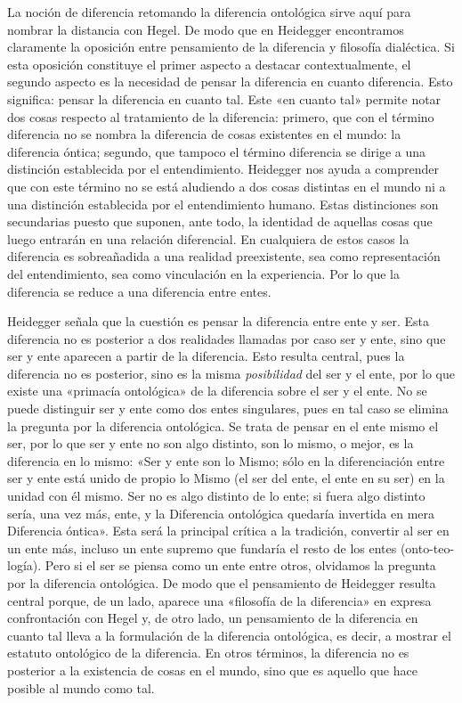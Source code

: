 La noción de diferencia retomando la diferencia ontológica sirve aquí para nombrar la distancia con Hegel. De modo que en Heidegger encontramos claramente la oposición entre pensamiento de la diferencia y filosofía dialéctica. Si esta oposición constituye el primer aspecto a destacar contextualmente, el segundo aspecto es la necesidad de pensar la diferencia en cuanto diferencia. Esto significa: pensar la diferencia en cuanto tal. Este «en cuanto tal» permite notar dos cosas respecto al tratamiento de la diferencia: primero, que con el término diferencia no se nombra la diferencia de cosas existentes en el mundo: la diferencia óntica; segundo, que tampoco el término diferencia se dirige a una distinción establecida por el entendimiento. Heidegger nos ayuda a comprender que con este término no se está aludiendo a dos cosas distintas en el mundo ni a una distinción establecida por el entendimiento humano. Estas distinciones son secundarias puesto que suponen, ante todo, la identidad de aquellas cosas que luego entrarán en una relación diferencial. En cualquiera de estos casos la diferencia es sobreañadida a una realidad preexistente, sea como representación del entendimiento, sea como vinculación en la experiencia. Por lo que la diferencia se reduce a una diferencia entre entes.

Heidegger señala que la cuestión es pensar la diferencia entre ente y ser. Esta diferencia no es posterior a dos realidades llamadas por caso ser y ente, sino que ser y ente aparecen a partir de la diferencia. Esto resulta central, pues la diferencia no es posterior, sino es la misma \emph{posibilidad} del ser y el ente, por lo que existe una «primacía ontológica» de la diferencia sobre el ser y el ente. No se puede distinguir ser y ente como dos entes singulares, pues en tal caso se elimina la pregunta por la diferencia ontológica. Se trata de pensar en el ente mismo el ser, por lo que ser y ente no son algo distinto, son lo mismo, o mejor, es la diferencia en lo mismo: «Ser y ente son lo Mismo; sólo en la diferenciación entre ser y ente está unido de propio lo Mismo (el ser del ente, el ente en su ser) en la unidad con él mismo. Ser no es algo distinto de lo ente; si fuera algo distinto sería, una vez más, ente, y la Diferencia ontológica quedaría invertida en mera Diferencia óntica». Esta será la principal crítica a la tradición, convertir al ser en un ente más, incluso un ente supremo que fundaría el resto de los entes (onto-teo-logía). Pero si el ser se piensa como un ente entre otros, olvidamos la pregunta por la diferencia ontológica. De modo que el pensamiento de Heidegger resulta central porque, de un lado, aparece una «filosofía de la diferencia» en expresa confrontación con Hegel y, de otro lado, un pensamiento de la diferencia en cuanto tal lleva a la formulación de la diferencia ontológica, es decir, a mostrar el estatuto ontológico de la diferencia. En otros términos, la diferencia no es posterior a la existencia de cosas en el mundo, sino que es aquello que hace posible al mundo como tal.


